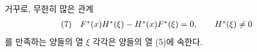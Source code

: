 
거꾸로, 무한히 많은 관계
\[
\begin{array}{@{}l@{\quad}c@{}}
(7)&F^*(x)H^*(\xi)-H^*(x)F^*(\xi)=0,\qquad H^*(\xi)\ne0
\end{array}
\]
를 만족하는 양들의 열 $\xi$ 각각은 양들의 열 (5)에 속한다.
